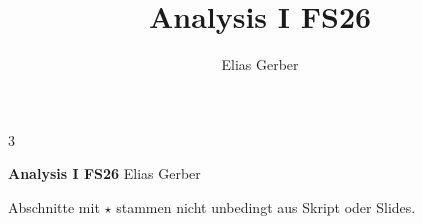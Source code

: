 \documentclass[8pt, a4paper]{extarticle}
\title{Analysis I FS26}
\author{Elias Gerber}
\date{}
\numberwithin{equation}{section}
\begin{document}
\begin{multicols*}{3}

    {\large \textbf{Analysis I FS26}}
    Elias Gerber

    Abschnitte mit $\star$ stammen nicht unbedingt aus Skript oder Slides.

    
    
    

\end{multicols*}

\pagebreak

\clearpage
\end{document}

